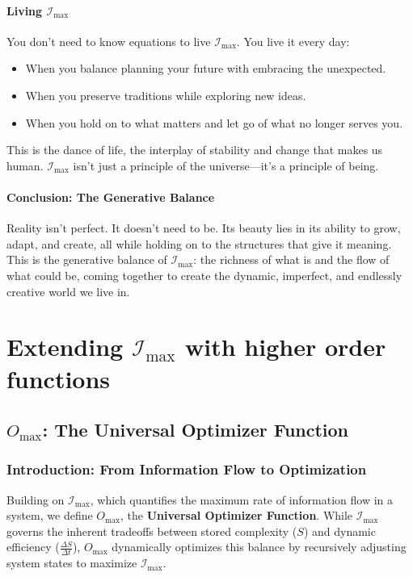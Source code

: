 \documentclass[12pt]{article}
\begin{document}
\paragraph{Living \(\mathcal{I}_{\text{max}}\)}
You don’t need to know equations to live \(\mathcal{I}_{\text{max}}\). You live it every day:
\begin{itemize}
    \item When you balance planning your future with embracing the unexpected.
    \item When you preserve traditions while exploring new ideas.
    \item When you hold on to what matters and let go of what no longer serves you.
\end{itemize}
This is the dance of life, the interplay of stability and change that makes us human. \(\mathcal{I}_{\text{max}}\) isn’t just a principle of the universe—it’s a principle of being.

\paragraph{Conclusion: The Generative Balance}
Reality isn’t perfect. It doesn’t need to be. Its beauty lies in its ability to grow, adapt, and create, all while holding on to the structures that give it meaning. This is the generative balance of \(\mathcal{I}_{\text{max}}\): the richness of what is and the flow of what could be, coming together to create the dynamic, imperfect, and endlessly creative world we live in.


\section{Extending \(\mathcal{I}_{\text{max}}\) with higher order functions}
\subsection{\(O_{\text{max}}\): The Universal Optimizer Function}

\subsubsection{Introduction: From Information Flow to Optimization}

Building on \(\mathcal{I}_{\text{max}}\), which quantifies the maximum rate of information flow in a system, we define \(O_{\text{max}}\), the \textbf{Universal Optimizer Function}. While \(\mathcal{I}_{\text{max}}\) governs the inherent tradeoffs between stored complexity (\(S\)) and dynamic efficiency (\(\frac{\Delta S}{\Delta t}\)), \(O_{\text{max}}\) dynamically optimizes this balance by recursively adjusting system states to maximize \(\mathcal{I}_{\text{max}}\). 
\end{document}

